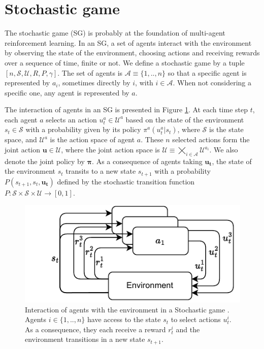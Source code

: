 \section{Stochastic game}
\label{sec:ch2_stochastic_Game}

The stochastic game (SG) \citep{stochasticGames} is probably at the foundation of multi-agent reinforcement learning.
In an SG, a set of agents interact with the environment by observing the state of the environment, choosing actions and receiving rewards over a sequence of time, finite or not.
We define a stochastic game by a tuple $[n, \mathcal{S}, \mathcal{U}, R, P, \gamma]$.
The set of agents is $\mathcal{A} \equiv \{1,..,n\}$ so that a specific agent is represented by $a_i$, sometimes directly by $i$, with $i \in \mathcal{A}$.
When not considering a specific one, any agent is represented by $a$.

The interaction of agents in an SG is presented in Figure \ref{fig:ch2_sg}.
At each time step $t$, each agent $a$ selects an action $u_t^a \in \mathcal{U}^a$ based on the state of the environment $s_t \in \mathcal{S}$ with a probability given by its policy $\pi^a(u^a_t|s_t)$, where $\mathcal{S}$ is the state space, and $\mathcal{U}^a$ is the action space of agent $a$.
These $n$ selected actions form the joint action $\mathbf{u} \in \mathcal{U}$, where the joint action space is $\mathcal{U} \equiv \bigtimes_{i \in \mathcal{A}} \mathcal{U}^{a_i}$.
We also denote the joint policy by $\mathbf{\pi}$.
As a consequence of agents taking $\mathbf{u_t}$, the state of the environment $s_t$ transits to a new state $s_{t+1}$ with a probability $P(s_{t+1}, s_t, \mathbf{u_t})$ defined by the stochastic transition function $P:\mathcal{S} \times \mathcal{S} \times \mathcal{U} \rightarrow [0,1]$.

\begin{figure}
    \centering
    \includegraphics[width=.8\textwidth]{tex_thesis/figures/ch2/SG.pdf}
    \caption{Interaction of agents with the environment in a Stochastic game \citep{stochasticGames}. Agents $i \in \{1,..,n\}$ have access to the state $s_t$ to select actions $u_t^i$. As a consequence, they each receive a reward $r_t^i$ and the environment transitions in a new state $s_{t+1}$.}
    \label{fig:ch2_sg}
\end{figure}

